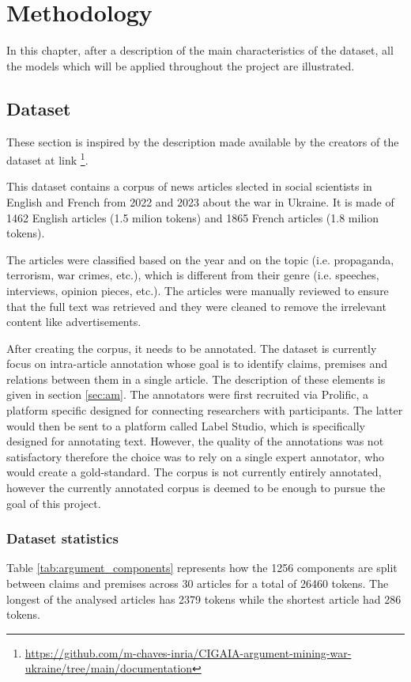\chapter{Methodology}\label{chapter:3}
In this chapter, after a description of the main characteristics of the dataset, all the models which will be applied 
throughout the project are illustrated.
\section{Dataset}
These section is inspired by the description made available by the creators of the dataset 
at link \footnote{\url{https://github.com/m-chaves-inria/CIGAIA-argument-mining-war-ukraine/tree/main/documentation}}.


This dataset contains a corpus of news articles slected in social scientists in English and French from 2022 and 2023 
about the war in Ukraine. It is made of 1462 English articles (1.5 milion tokens) and 1865 French articles (1.8 milion 
tokens).


The articles were classified based on the year and on the topic (i.e. propaganda, terrorism, war crimes, etc.), 
which is different from their genre (i.e. speeches, interviews, opinion pieces, etc.). The articles were manually
reviewed to ensure that the full text was retrieved and they were cleaned to remove the irrelevant content like 
advertisements.

After creating the corpus, it needs to be annotated. The dataset is currently focus on intra-article annotation whose goal
is to identify claims, premises and relations between them in a single article. The description of these elements is given 
in section \ref{sec:am}. The annotators were first recruited via Prolific, a platform specific designed for connecting 
researchers with participants. The latter would then be sent to a platform called Label Studio, which is specifically 
designed for annotating text. However, the quality of the annotations was not satisfactory therefore the choice was to 
rely on a single expert annotator, who would create a gold-standard. The corpus is not currently entirely annotated, 
however the currently annotated corpus is deemed to be enough to pursue the goal of this project.
\subsection{Dataset statistics}
Table \ref{tab:argument_components} represents how the 1256 components are split between claims and premises across 30 articles for a total of 
26460 tokens. The longest of the analysed articles has 2379 tokens while the shortest article had 286 tokens. 

